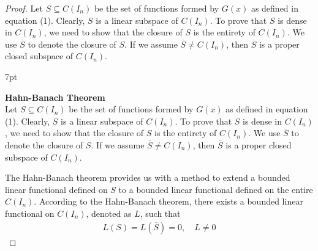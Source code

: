\documentclass[12pt]{article}
\newenvironment{formal}{%
\def\FrameCommand{%
\hspace{1pt}%
{\color{Blue}\vrule width 2pt}%
{\color{formalshade}\vrule width 4pt}%
\colorbox{formalshade}%
}%
\MakeFramed{\advance\hsize-\width\FrameRestore}%
\noindent\hspace{-4.55pt}%
\begin{adjustwidth}{}{7pt}%
\vspace{2pt}\vspace{2pt}%
}
{%
\vspace{2pt}\end{adjustwidth}\endMakeFramed%
}
\begin{document}
\begin{proof}
    Let $S \subseteq C(I_n)$ be the set of functions formed by $G(x)$ as defined in equation (1). Clearly, $S$ is a linear subspace of $C(I_n)$. To prove that $S$ is dense in $C(I_n)$, we need to show that the closure of $S$ is the entirety of $C(I_n)$. We use $\overline{S}$ to denote the closure of $S$. If we assume $\overline{S} \neq C(I_n)$, then $\overline{S}$ is a proper closed subspace of $C(I_n)$.
\begin{formal}
\textbf{Hahn-Banach Theorem}\\
Let $S \subseteq C(I_n)$ be the set of functions formed by $G(x)$ as defined in equation (1). Clearly, $S$ is a linear subspace of $C(I_n)$. To prove that $S$ is dense in $C(I_n)$, we need to show that the closure of $S$ is the entirety of $C(I_n)$. We use $\overline{S}$ to denote the closure of $S$. If we assume $\overline{S} \neq C(I_n)$, then $\overline{S}$ is a proper closed subspace of $C(I_n)$.
\end{formal}

The Hahn-Banach theorem provides us with a method to extend a bounded linear functional defined on $S$ to a bounded linear functional defined on the entire $C(I_n)$. According to the Hahn-Banach theorem, there exists a bounded linear functional on $C(I_n)$, denoted as $L$, such that
\begin{align*}
    L(S)=L(\overline{S})=0,\quad L\neq 0
\end{align*}


\end{proof}
\end{document}
